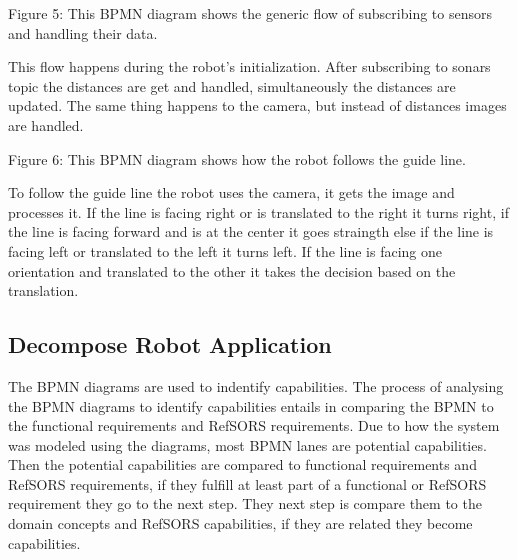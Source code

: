 Figure 5: This BPMN diagram shows the generic flow of subscribing to sensors and handling their data.

This flow happens during the robot's initialization. After subscribing to sonars topic the distances are get and handled, simultaneously the distances are updated. The same thing happens to the camera, but instead of distances images are handled.


Figure 6: This BPMN diagram shows how the robot follows the guide line.

To follow the guide line the robot uses the camera, it gets the image and processes it. If the line is facing right or is translated to the right it turns right, if the line is facing forward and is at the center it goes straingth else if the line is facing left or translated to the left it turns left. If the line is facing one orientation and translated to the other it takes the decision based on the translation.

\subsection{Decompose Robot Application}

The BPMN diagrams are used to indentify capabilities. The process of analysing the BPMN diagrams to identify capabilities entails in comparing the BPMN to the functional requirements and RefSORS requirements. Due to how the system was modeled using the diagrams, most BPMN lanes are potential capabilities. Then the potential capabilities are compared to functional requirements and RefSORS requirements, if they fulfill at least part of a functional or RefSORS requirement they go to the next step. They next step is compare them to the domain concepts and RefSORS capabilities, if they are related they become capabilities.


